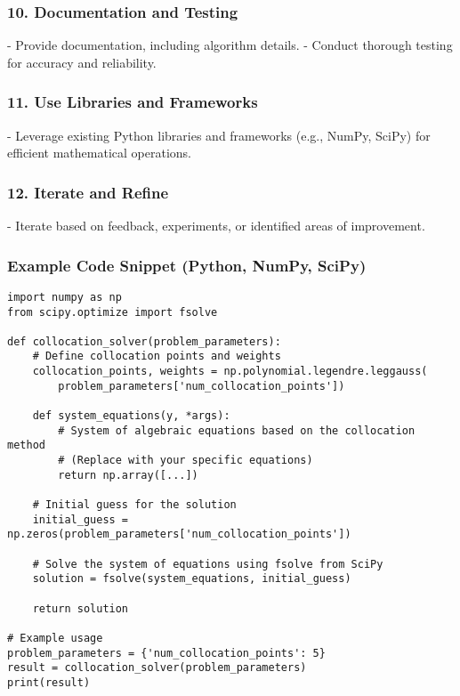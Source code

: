 \documentclass{report}
\begin{document}
\subsubsection{10. Documentation and Testing}
   - Provide documentation, including algorithm details.
   - Conduct thorough testing for accuracy and reliability.

\subsubsection{11. Use Libraries and Frameworks}
   - Leverage existing Python libraries and frameworks (e.g., NumPy, SciPy) for efficient mathematical operations.

\subsubsection{12. Iterate and Refine}
   - Iterate based on feedback, experiments, or identified areas of improvement.

\subsubsection{Example Code Snippet (Python, NumPy, SciPy)}
\begin{verbatim}
import numpy as np
from scipy.optimize import fsolve

def collocation_solver(problem_parameters):
    # Define collocation points and weights
    collocation_points, weights = np.polynomial.legendre.leggauss(
        problem_parameters['num_collocation_points'])

    def system_equations(y, *args):
        # System of algebraic equations based on the collocation method
        # (Replace with your specific equations)
        return np.array([...])

    # Initial guess for the solution
    initial_guess = np.zeros(problem_parameters['num_collocation_points'])

    # Solve the system of equations using fsolve from SciPy
    solution = fsolve(system_equations, initial_guess)

    return solution

# Example usage
problem_parameters = {'num_collocation_points': 5}
result = collocation_solver(problem_parameters)
print(result)
\end{verbatim}



\end{document}
